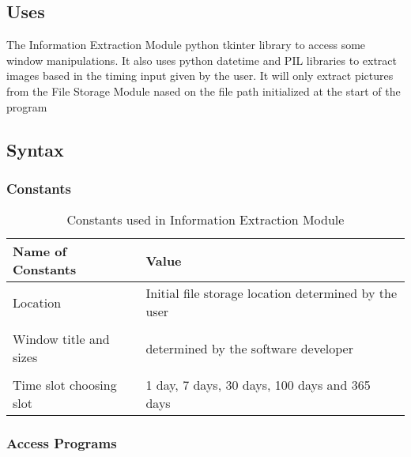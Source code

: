 \documentclass[12pt, titlepage]{article}
\begin{document}
\subsection{Uses}

The Information Extraction Module python tkinter library to access some window manipulations. It also uses python datetime and PIL libraries to extract images based in the timing input given by the user. It will only extract pictures from the File Storage Module nased on the file path initialized at the start of the program

\subsection{Syntax}

\subsubsection{Constants}


\begin{table}[H]
\caption{Constants used in Information Extraction Module} 
\begin{tabularx}{\textwidth}{XX}
\toprule
\textbf{Name of Constants} & \textbf{Value}\\
\midrule
Location & Initial file storage location determined by the user\\\\
Window title and sizes & determined by the software developer\\\\
Time slot choosing slot & 1 day, 7 days, 30 days, 100 days and 365 days\\

\bottomrule
\end{tabularx}
\end{table}

\subsubsection{Access Programs}
\end{document}
